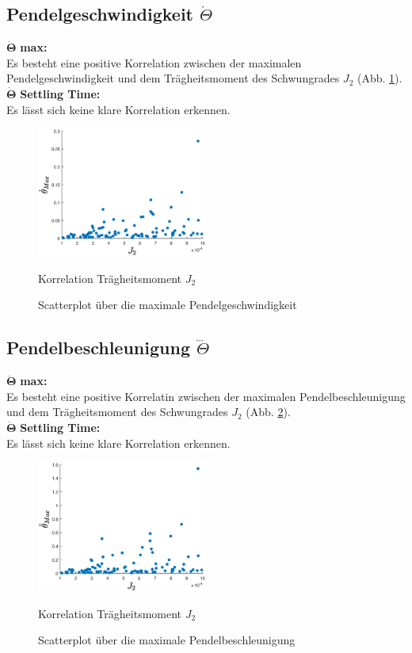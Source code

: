 \subsection*{Pendelgeschwindigkeit $\dot\Theta$}
$\bm{\dot\Theta}$ \textbf{max: }\\
Es besteht eine positive Korrelation zwischen der maximalen Pendelgeschwindigkeit und dem Trägheitsmoment des Schwungrades $J_2$ (Abb. \ref{fig:scatter_dottheta_max_j2}).\\
$\bm{\dot\Theta}$ \textbf{Settling Time: }\\
Es lässt sich keine klare Korrelation erkennen.\\
\begin{figure}
        \centering
        \includegraphics[width=0.5\textwidth]{Bilder/5_sensi/cm/dot_theta_max_J2.eps}
        \caption{Korrelation Trägheitsmoment $J_2$}
        \label{fig:scatter_dottheta_max_j2}
    \caption{Scatterplot über die maximale Pendelgeschwindigkeit}
\end{figure}
\subsection*{Pendelbeschleunigung $\dddot\Theta$}
$\bm{\ddot\Theta}$ \textbf{max: }\\
Es besteht eine positive Korrelatin zwischen der maximalen Pendelbeschleunigung und dem Trägheitsmoment des Schwungrades $J_2$ (Abb. \ref{fig:scatter_dotdottheta_max_j2}).\\

$\bm{\ddot\Theta}$ \textbf{Settling Time: }\\
Es lässt sich keine klare Korrelation erkennen.\\
\begin{figure}
        \centering
        \includegraphics[width=0.5\textwidth]{Bilder/5_sensi/cm/dotdot_theta_max_J2.eps}
        \caption{Korrelation Trägheitsmoment $J_2$}
        \label{fig:scatter_dotdottheta_max_j2}
    \caption{Scatterplot über die maximale Pendelbeschleunigung}
\end{figure}

